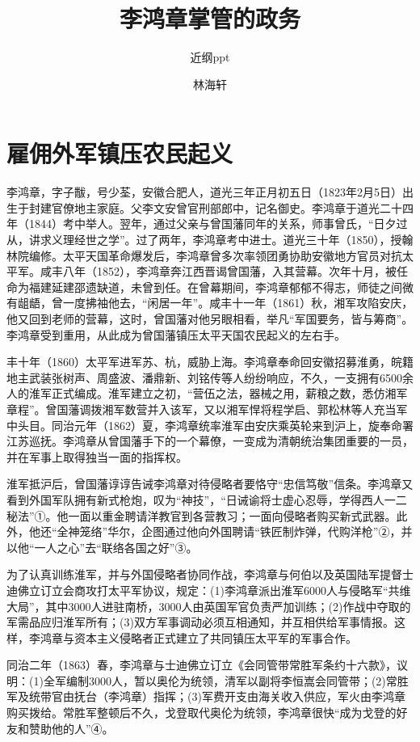 \documentclass[10pt,a4paper]{beamer} %
\begin{document}
	
	\title{李鸿章掌管的政务}
	\subtitle{近纲ppt}
	\author{林海轩}
	\date{}
	
	\begin{frame}
		\titlepage
	\end{frame}
	
	\begin{frame}
		\tableofcontents
	\end{frame}
	
	
	\section{雇佣外军镇压农民起义}
	\begin{frame}
		李鸿章，字子黻，号少荃，安徽合肥人，道光三年正月初五日（1823年2月5日）出生于封建官僚地主家庭。父李文安曾官刑部郎中，记名御史。李鸿章于道光二十四年（1844）考中举人。翌年，通过父亲与曾国藩同年的关系，师事曾氏，“日夕过从，讲求义理经世之学”。过了两年，李鸿章考中进士。道光三十年（1850），授翰林院编修。太平天国革命爆发后，李鸿章曾多次率领团勇协助安徽地方官员对抗太平军。咸丰八年（1852），李鸿章奔江西晋谒曾国藩，入其营幕。次年十月，被任命为福建延建邵遗缺道，未曾到任。在曾幕期间，李鸿章郁郁不得志，师徒之间微有龃龉，曾一度拂袖他去，“闲居一年”。咸丰十一年（1861）秋，湘军攻陷安庆，他又回到老师的营幕，这时，曾国藩对他另眼相看，举凡“军国要务，皆与筹商”。李鸿章受到重用，从此成为曾国藩镇压太平天国农民起义的左右手。
	\end{frame}
	\begin{frame}
		丰十年（1860）太平军进军苏、杭，威胁上海。李鸿章奉命回安徽招募淮勇，皖籍地主武装张树声、周盛波、潘鼎新、刘铭传等人纷纷响应，不久，一支拥有6500余人的淮军正式编成。淮军建立之初，“营伍之法，器械之用，薪粮之数，悉仿湘军章程”。曾国藩调拨湘军数营并入该军，又以湘军悍将程学启、郭松林等人充当军中头目。同治元年（1862）夏，李鸿章统率淮军由安庆乘英轮来到沪上，旋奉命署江苏巡抚。李鸿章从曾国藩手下的一个幕僚，一变成为清朝统治集团重要的一员，并在军事上取得独当一面的指挥权。
	\end{frame}
	\begin{frame}
		淮军抵沪后，曾国藩谆谆告诫李鸿章对待侵略者要恪守“忠信笃敬”信条。李鸿章又看到外国军队拥有新式枪炮，叹为“神技”，“日诫谕将士虚心忍辱，学得西人一二秘法”①。他一面以重金聘请洋教官到各营教习；一面向侵略者购买新式武器。此外，他还“全神笼络”华尔，企图通过他向外国聘请“铁匠制炸弹，代购洋枪”②，并以他“一人之心”去“联络各国之好”③。
		
		为了认真训练淮军，并与外国侵略者协同作战，李鸿章与何伯以及英国陆军提督士迪佛立订立会商攻打太平军协议，规定：(1)李鸿章派出淮军6000人与侵略军“共维大局”，其中3000人进驻南桥，3000人由英国军官负责严加训练；(2)作战中夺取的军需品应归淮军所有；(3)双方军事调动必须互相通知，并互相供给军事情报。这样，李鸿章与资本主义侵略者正式建立了共同镇压太平军的军事合作。
		
		同治二年（1863）春，李鸿章与士迪佛立订立《会同管带常胜军条约十六款》，议明：(1)全军编制3000人，暂以奥伦为统领，清军以副将李恒嵩会同管带；(2)常胜军及统带官由抚台（李鸿章）指挥；(3)军费开支由海关收入供应，军火由李鸿章购买拨给。常胜军整顿后不久，戈登取代奥伦为统领，李鸿章很快“成为戈登的好友和赞助他的人”④。
	\end{frame}
\end{document}
